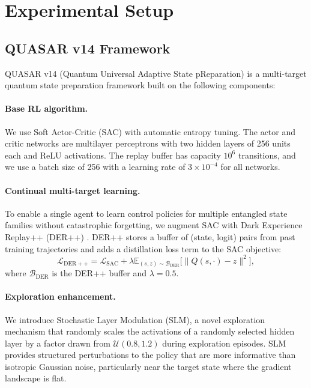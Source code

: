 \section{Experimental Setup}
\label{sec:experiments}

\subsection{QUASAR v14 Framework}

QUASAR v14 (Quantum Universal Adaptive State pReparation) is a multi-target
quantum state preparation framework built on the following components:

\paragraph{Base RL algorithm.}
We use Soft Actor-Critic (SAC) \cite{haarnoja2018soft} with automatic entropy
tuning. The actor and critic networks are multilayer perceptrons with two hidden
layers of 256 units each and ReLU activations. The replay buffer has capacity
$10^6$ transitions, and we use a batch size of 256 with a learning rate of
$3 \times 10^{-4}$ for all networks.

\paragraph{Continual multi-target learning.}
To enable a single agent to learn control policies for multiple entangled state
families without catastrophic forgetting, we augment SAC with Dark Experience
Replay++ (DER++) \cite{buzzega2020dark}. DER++ stores a buffer of (state, logit)
pairs from past training trajectories and adds a distillation loss term to the
SAC objective:
\begin{equation}
  \mathcal{L}_{\mathrm{DER++}} = \mathcal{L}_{\mathrm{SAC}} +
  \lambda \mathbb{E}_{(s, z) \sim \mathcal{B}_{\mathrm{DER}}}
  \bigl[\|Q(s, \cdot) - z\|^2\bigr],
\end{equation}
where $\mathcal{B}_{\mathrm{DER}}$ is the DER++ buffer and $\lambda = 0.5$.

\paragraph{Exploration enhancement.}
We introduce Stochastic Layer Modulation (SLM), a novel exploration mechanism
that randomly scales the activations of a randomly selected hidden layer by a
factor drawn from $\mathcal{U}(0.8, 1.2)$ during exploration episodes. SLM
provides structured perturbations to the policy that are more informative than
isotropic Gaussian noise, particularly near the target state where the gradient
landscape is flat.

